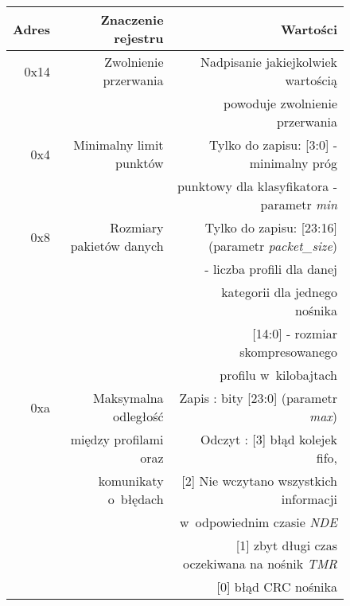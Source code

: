  \begin{figure}[h]
	\centering
	\begin{tabular}{|r|r|r|}
		\hline
		Adres & Znaczenie rejestru & Wartości \\
		\hline
		0x14 &  Zwolnienie przerwania & Nadpisanie jakiejkolwiek wartością  \\
			 &						  & powoduje zwolnienie przerwania	   \\
		\hline
		0x4 &  Minimalny limit punktów & Tylko do zapisu: [3:0] - minimalny próg \\
			&						   & punktowy dla klasyfikatora - parametr \textit{min} \\
 		\hline
 		0x8 & Rozmiary pakietów danych & Tylko do zapisu: [23:16] (parametr \textit{packet\_size}) \\	
 		& 						   & - liczba profili dla danej \\
 		& 						   & kategorii dla jednego nośnika  \\
 		&						   & [14:0] - rozmiar skompresowanego \\
 		&						   & profilu w~kilobajtach	\\
 		\hline
		0xa & Maksymalna odległość	   & Zapis : bity [23:0] (parametr \textit{max})\\
		& między profilami oraz	   & Odczyt : [3] błąd kolejek fifo, \\
		& komunikaty o~błędach     & [2] Nie wczytano wszystkich informacji \\
		& 	   					   & w~odpowiednim czasie \textit{NDE} \\
		&						   & [1] zbyt długi czas oczekiwana na nośnik \textit{TMR} \\
		&						   & [0] błąd CRC nośnika	\\
		

\end{tabular}
\end{figure}
